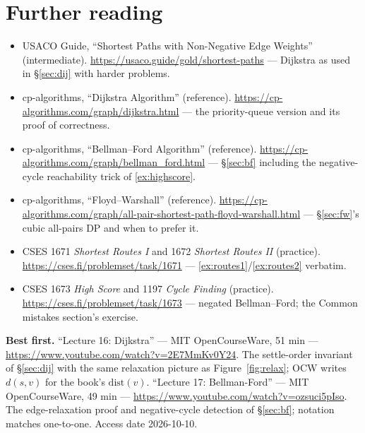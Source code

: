 \section*{Further reading}
\begin{itemize}
\item USACO Guide, ``Shortest Paths with Non-Negative Edge Weights''
(intermediate). \url{https://usaco.guide/gold/shortest-paths} ---
Dijkstra as used in \S\ref{sec:dij} with harder problems.
\item cp-algorithms, ``Dijkstra Algorithm'' (reference).
\url{https://cp-algorithms.com/graph/dijkstra.html} --- the
priority-queue version and its proof of correctness.
\item cp-algorithms, ``Bellman--Ford Algorithm'' (reference).
\url{https://cp-algorithms.com/graph/bellman_ford.html} ---
\S\ref{sec:bf} including the negative-cycle reachability trick of
\ref{ex:highscore}.
\item cp-algorithms, ``Floyd--Warshall'' (reference).
\url{https://cp-algorithms.com/graph/all-pair-shortest-path-floyd-warshall.html}
--- \S\ref{sec:fw}'s cubic all-pairs DP and when to prefer it.
\item CSES 1671 \emph{Shortest Routes I} and 1672 \emph{Shortest
Routes II} (practice). \url{https://cses.fi/problemset/task/1671} ---
\ref{ex:routes1}/\ref{ex:routes2} verbatim.
\item CSES 1673 \emph{High Score} and 1197 \emph{Cycle Finding}
(practice). \url{https://cses.fi/problemset/task/1673} --- negated
Bellman--Ford; the Common mistakes section's exercise.
\end{itemize}

\begin{rulebox}
\smallskip\noindent\textbf{Best first.}
``Lecture 16: Dijkstra'' --- MIT OpenCourseWare, 51 min ---
\url{https://www.youtube.com/watch?v=2E7MmKv0Y24}. The settle-order
invariant of \S\ref{sec:dij} with the same relaxation picture as
Figure~\ref{fig:relax}; OCW writes $d(s,v)$ for the book's
$\mathrm{dist}(v)$.
\smallskip\noindent
``Lecture 17: Bellman-Ford'' --- MIT OpenCourseWare, 49 min ---
\url{https://www.youtube.com/watch?v=ozsuci5pIso}. The edge-relaxation
proof and negative-cycle detection of \S\ref{sec:bf}; notation matches
one-to-one. Access date 2026-10-10.
\end{rulebox}
